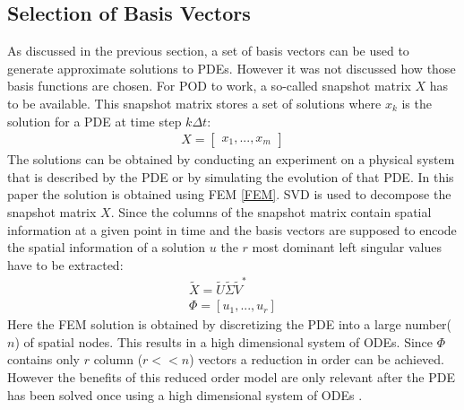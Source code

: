 \subsection{Selection of Basis Vectors}
As discussed in the previous section, a set of basis vectors can be used to generate approximate solutions to PDEs.
However it was not discussed how those basis functions are chosen.
For POD to work, a so-called snapshot matrix \(X\) has to be available.
This snapshot matrix stores a set of solutions where \(x_k\) is the solution for a PDE at time step \(k\Delta t\):
\begin{gather}
X = \begin{bmatrix}
x_1, ..., x_m
\end{bmatrix}
\end{gather}
The solutions can be obtained by conducting an experiment on a physical system that is described by the PDE or by simulating the evolution of that PDE.
In this paper the solution is obtained using FEM \ref{FEM}.
SVD is used to decompose the snapshot matrix \(X\).
Since the columns of the snapshot matrix contain spatial information at a given point in time and the basis vectors are supposed to encode the spatial information of a solution \(u\) the \(r\) most dominant left singular values have to be extracted:
\begin{gather}
\tilde{X} = \tilde{U}\tilde{\Sigma}\tilde{V}^{*} \\
\Phi = [u_1, ..., u_r] \label{PHI}
\end{gather}
Here the FEM solution is obtained by discretizing the PDE into a large number(\(n\)) of spatial nodes.
This results in a high dimensional system of ODEs.
Since \(\Phi\) contains only \(r\) column (\(r << n\)) vectors a reduction in order can be achieved.
However the benefits of this reduced order model are only relevant after the PDE has been solved once using a high dimensional system of ODEs \cite{brunton_kutz_2019c}.
